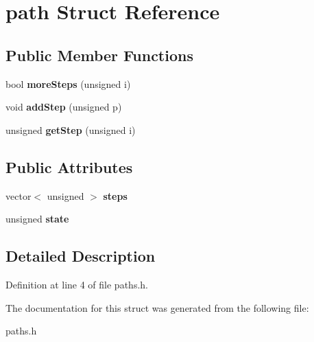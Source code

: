 \hypertarget{structpath}{}\section{path Struct Reference}
\label{structpath}
\subsection*{Public Member Functions}
\begin{DoxyCompactItemize}
\item 
\mbox{\label{structpath_a5838a039eae1179aa864c18417d978af}} 
bool {\bfseries more\+Steps} (unsigned i)
\item 
\mbox{\label{structpath_a9e28328714d0c5862ebc669ba291036b}} 
void {\bfseries add\+Step} (unsigned p)
\item 
\mbox{\label{structpath_a4730ac26614cfed4d2aab06b886e9028}} 
unsigned {\bfseries get\+Step} (unsigned i)
\end{DoxyCompactItemize}
\subsection*{Public Attributes}
\begin{DoxyCompactItemize}
\item 
\mbox{\label{structpath_ab4d93948d87dc414de83e18df554071e}} 
vector$<$ unsigned $>$ {\bfseries steps}
\item 
\mbox{\label{structpath_ab416d47f6bde978069766f5e9de0b468}} 
unsigned {\bfseries state}
\end{DoxyCompactItemize}


\subsection{Detailed Description}


Definition at line 4 of file paths.\+h.



The documentation for this struct was generated from the following file\+:\begin{DoxyCompactItemize}
\item 
paths.\+h\end{DoxyCompactItemize}
